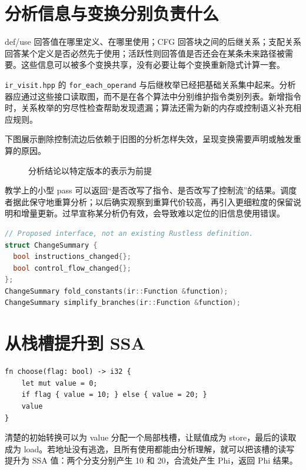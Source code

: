 \section{分析信息与变换分别负责什么}
def/use 回答值在哪里定义、在哪里使用；CFG 回答块之间的后继关系；支配关系回答某个定义是否必然先于使用；活跃性则回答值是否还会在某条未来路径被需要。这些信息可以被多个变换共享，没有必要让每个变换重新隐式计算一套。

\texttt{ir\_visit.hpp} 的 \texttt{for\_each\_operand} 与后继枚举已经把基础关系集中起来。分析器应通过这些接口读取图，而不是在各个算法中分别维护指令类别列表。新增指令时，关系枚举的穷尽性检查帮助发现遗漏；算法还需为新的内存或控制语义补充相应规则。

下图展示删除控制流边后依赖于旧图的分析怎样失效，呈现变换需要声明或触发重算的原因。
\begin{figure}[htbp]\centering
{}
\caption{分析结论以特定版本的表示为前提}
\end{figure}

教学上的小型 pass 可以返回“是否改写了指令、是否改写了控制流”的结果。调度者据此保守地重算分析；以后确实观察到重算代价较高，再引入更细粒度的保留说明和增量更新。过早宣称某分析仍有效，会导致难以定位的旧信息使用错误。

\begin{lstlisting}[language=C++,caption={教学建议：小型变换接口明确报告变化}]
// Proposed interface, not an existing Rustless definition.
struct ChangeSummary {
  bool instructions_changed{};
  bool control_flow_changed{};
};
ChangeSummary fold_constants(ir::Function &function);
ChangeSummary simplify_branches(ir::Function &function);
\end{lstlisting}

\section{从栈槽提升到 SSA}
\begin{lstlisting}[language=Rustless,caption={一个可由值版本替代存储的局部变量}]
fn choose(flag: bool) -> i32 {
    let mut value = 0;
    if flag { value = 10; } else { value = 20; }
    value
}
\end{lstlisting}
清楚的初始转换可以为 value 分配一个局部栈槽，让赋值成为 store，最后的读取成为 load。若地址没有逃逸，且所有使用都能由分析理解，就可以把该槽的读写提升为 SSA 值：两个分支分别产生 10 和 20，合流处产生 Phi，返回 Phi 结果。

